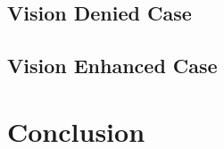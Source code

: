 \documentclass[conference]{IEEEtran}
\begin{document}
\subsection{Vision Denied Case}

\subsection{Vision Enhanced Case}



\section{Conclusion}







\end{document}
